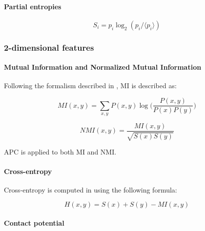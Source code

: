         \paragraph{Partial entropies}


            \begin{equation}
                S_i = p_i \log_2 (p_i / \langle p_i \rangle)
            \end{equation}

    \subsubsection{2-dimensional features}

        \paragraph{Mutual Information and Normalized Mutual Information}

            Following the formalism described in \cite{Michel383133}, MI is described as:

            \begin{equation}
                MI(x, y) = \sum\limits_{x, y} P(x, y) \log \Big( \frac{P(x, y)}{P(x) P(y)} \Big)
            \end{equation}

            \begin{equation}
                NMI(x, y) = \frac{MI(x, y)}{\sqrt{S(x) S(y)}}
            \end{equation}

            APC is applied to both MI and NMI.

        \paragraph{Cross-entropy}

            Cross-entropy is computed in \cite{Michel383133} using the following formula:
            
            \begin{equation}
                H(x, y) = S(x) + S(y) - MI(x, y)
            \end{equation}

        \paragraph{Contact potential}

